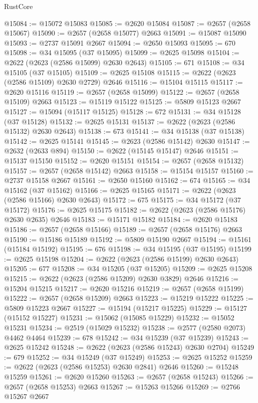 \begin{lexlean}{RustCore}
\begin{coremodule}
@15084 := @15072 @15083
@15085 := @2620 @15084
@15087 := @2657 (@2658 @15067)
@15090 := @2657 (@2658 @15077) @2663
@15091 := @15087 @15090
@15093 := @2737 @15091 @2667
@15094 := @2650 @15093
@15095 := 670
@15098 := @34 @15095 (@37 @15095)
@15099 := @2625 @15098
@15104 := @2622 (@2623 (@2586 @15099) @2630 @2643)
@15105 := 671
@15108 := @34 @15105 (@37 @15105)
@15109 := @2625 @15108
@15115 := @2622 (@2623 (@2586 @15109) @2630 @2729) @2646
@15116 := @15104 @15115
@15117 := @2620 @15116
@15119 := @2657 (@2658 @15099)
@15122 := @2657 (@2658 @15109) @2663
@15123 := @15119 @15122
@15125 := @5809 @15123 @2667
@15127 := @15094 (@15117 @15125)
@15128 := 672
@15131 := @34 @15128 (@37 @15128)
@15132 := @2625 @15131
@15137 := @2622 (@2623 (@2586 @15132) @2630 @2643)
@15138 := 673
@15141 := @34 @15138 (@37 @15138)
@15142 := @2625 @15141
@15145 := @2623 (@2586 @15142) @2630
@15147 := @2632 (@2633 @894)
@15150 := @2622 (@15145 @15147) @2646
@15151 := @15137 @15150
@15152 := @2620 @15151
@15154 := @2657 (@2658 @15132)
@15157 := @2657 (@2658 @15142) @2663
@15158 := @15154 @15157
@15160 := @2737 @15158 @2667
@15161 := @2650 @15160
@15162 := 674
@15165 := @34 @15162 (@37 @15162)
@15166 := @2625 @15165
@15171 := @2622 (@2623 (@2586 @15166) @2630 @2643)
@15172 := 675
@15175 := @34 @15172 (@37 @15172)
@15176 := @2625 @15175
@15182 := @2622 (@2623 (@2586 @15176) @2630 @2635) @2646
@15183 := @15171 @15182
@15184 := @2620 @15183
@15186 := @2657 (@2658 @15166)
@15189 := @2657 (@2658 @15176) @2663
@15190 := @15186 @15189
@15192 := @5809 @15190 @2667
@15194 := @15161 (@15184 @15192)
@15195 := 676
@15198 := @34 @15195 (@37 @15195)
@15199 := @2625 @15198
@15204 := @2622 (@2623 (@2586 @15199) @2630 @2643)
@15205 := 677
@15208 := @34 @15205 (@37 @15205)
@15209 := @2625 @15208
@15215 := @2622 (@2623 (@2586 @15209) @2630 @3829) @2646
@15216 := @15204 @15215
@15217 := @2620 @15216
@15219 := @2657 (@2658 @15199)
@15222 := @2657 (@2658 @15209) @2663
@15223 := @15219 @15222
@15225 := @5809 @15223 @2667
@15227 := @15194 (@15217 @15225)
@15229 := @15127 (@15152 @15227)
@15231 := @15062 (@15085 @15229)
@15232 := @15052 @15231
@15234 := @2519 (@15029 @15232)
@15238 := @2577 (@2580 @2073) @4462 @4464
@15239 := 678
@15242 := @34 @15239 (@37 @15239)
@15243 := @2625 @15242
@15248 := @2622 (@2623 (@2586 @15243) @2630 @2704)
@15249 := 679
@15252 := @34 @15249 (@37 @15249)
@15253 := @2625 @15252
@15259 := @2622 (@2623 (@2586 @15253) @2630 @2841) @2646
@15260 := @15248 @15259
@15261 := @2620 @15260
@15263 := @2657 (@2658 @15243)
@15266 := @2657 (@2658 @15253) @2663
@15267 := @15263 @15266
@15269 := @2766 @15267 @2667

\end{coremodule}
\end{lexlean}
